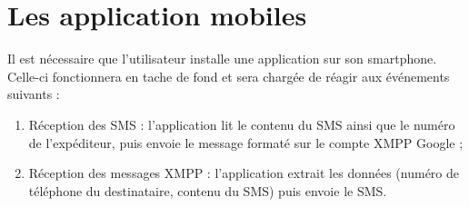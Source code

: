 \section{Les application mobiles}

Il est nécessaire que l'utilisateur installe une application sur son smartphone.
Celle-ci fonctionnera en tache de fond et sera chargée de réagir aux événements suivants :
\begin{enumerate}
	\item Réception des SMS : l'application lit le contenu du SMS ainsi que le numéro de l'expéditeur, puis envoie le message formaté sur le compte XMPP Google ;
	\item Réception des messages XMPP : l'application extrait les données (numéro de téléphone du destinataire, contenu du SMS) puis envoie le SMS.
\\
\end{enumerate}
